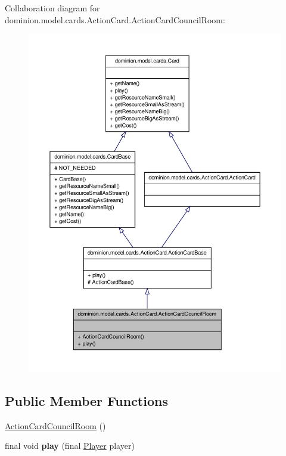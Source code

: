 \-Collaboration diagram for dominion.\-model.\-cards.\-Action\-Card.\-Action\-Card\-Council\-Room\-:
\nopagebreak
\begin{figure}[H]
\begin{center}
\leavevmode
\includegraphics[width=350pt]{classdominion_1_1model_1_1cards_1_1ActionCard_1_1ActionCardCouncilRoom__coll__graph}
\end{center}
\end{figure}
\subsection*{\-Public \-Member \-Functions}
\begin{DoxyCompactItemize}
\item 
\hyperlink{classdominion_1_1model_1_1cards_1_1ActionCard_1_1ActionCardCouncilRoom_acc5db1b2f6be127e664f2644985631b0}{\-Action\-Card\-Council\-Room} ()
\item 
\hypertarget{classdominion_1_1model_1_1cards_1_1ActionCard_1_1ActionCardCouncilRoom_acdef2918b83c26914193a78cb9a426c2}{final void {\bfseries play} (final \hyperlink{interfacedominion_1_1model_1_1Player}{\-Player} player)}\label{classdominion_1_1model_1_1cards_1_1ActionCard_1_1ActionCardCouncilRoom_acdef2918b83c26914193a78cb9a426c2}

\end{DoxyCompactItemize}



